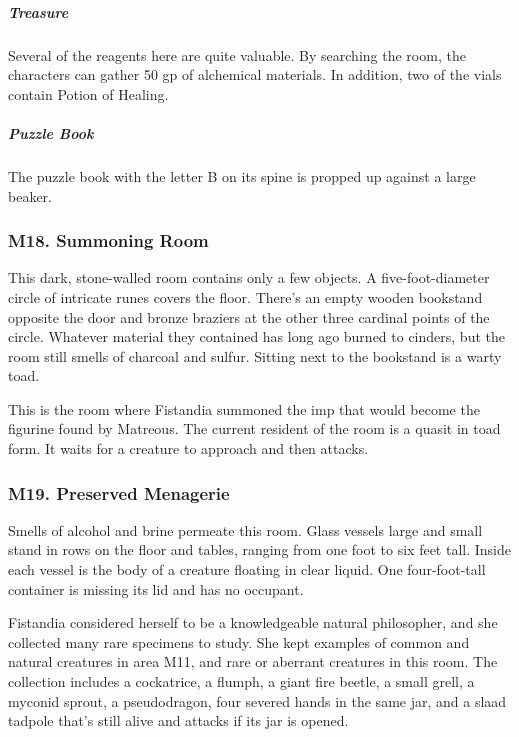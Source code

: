\documentclass[10pt,a4paper,twoside,bg=print,twocolumn,openany,nodeprecatedcode]{dndbook}
\begin{document}
\subparagraph{Treasure}
Several of the reagents here are quite valuable. By searching the room, the characters can gather 50 gp of alchemical materials. In addition, two of the vials contain Potion of Healing.

\subparagraph{Puzzle Book}
The puzzle book with the letter B on its spine is propped up against a large beaker.

\subsubsection{M18. Summoning Room}
\begin{DndReadAloud}{}
This dark, stone-walled room contains only a few objects. A five-foot-diameter circle of intricate runes covers the floor. There's an empty wooden bookstand opposite the door and bronze braziers at the other three cardinal points of the circle. Whatever material they contained has long ago burned to cinders, but the room still smells of charcoal and sulfur. Sitting next to the bookstand is a warty toad.

\end{DndReadAloud}

This is the room where Fistandia summoned the imp that would become the figurine found by Matreous. The current resident of the room is a quasit in toad form. It waits for a creature to approach and then attacks.

\subsubsection{M19. Preserved Menagerie}
\begin{DndReadAloud}{}
Smells of alcohol and brine permeate this room. Glass vessels large and small stand in rows on the floor and tables, ranging from one foot to six feet tall. Inside each vessel is the body of a creature floating in clear liquid. One four-foot-tall container is missing its lid and has no occupant.

\end{DndReadAloud}

Fistandia considered herself to be a knowledgeable natural philosopher, and she collected many rare specimens to study. She kept examples of common and natural creatures in area M11, and rare or aberrant creatures in this room. The collection includes a cockatrice, a flumph, a giant fire beetle, a small grell, a myconid sprout, a pseudodragon, four severed hands in the same jar, and a slaad tadpole that's still alive and attacks if its jar is opened.
\end{document}
